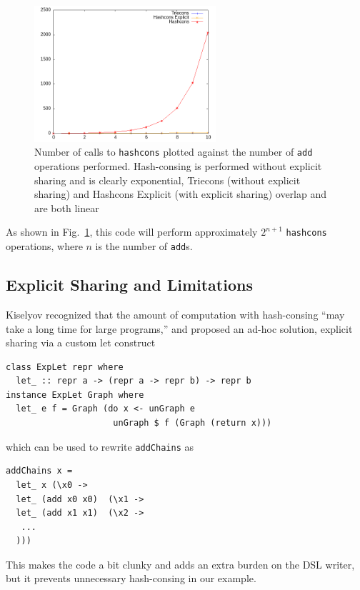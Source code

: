 \documentclass[runningheads]{llncs}
\begin{document}
\vspace{-1cm}
\begin{figure}
  \centering
  \includegraphics[width=0.6\textwidth]{figs/hashconscmp.png}
  \caption{Number of calls to \texttt{hashcons} plotted against the
    number of \texttt{add} operations performed.
    Hash-consing is performed without explicit sharing and is clearly exponential,
    Triecons (without explicit sharing) and Hashcons Explicit (with explicit
    sharing) overlap and are both linear
  } \label{fig:hashcons}
\end{figure}
As shown in Fig.~\ref{fig:hashcons}, this code will perform approximately
$2^{n+1}$ \texttt{hashcons} operations, where $n$ is the number of \texttt{add}s.

\subsection{Explicit Sharing and Limitations} \label{limitexplicit}

Kiselyov \cite{kiselyov:sharing} recognized that the amount of computation with
hash-consing ``may take a long time for large programs,'' and proposed an ad-hoc
solution, explicit sharing via a custom let construct
\begin{verbatim}
class ExpLet repr where
  let_ :: repr a -> (repr a -> repr b) -> repr b
instance ExpLet Graph where
  let_ e f = Graph (do x <- unGraph e
                     unGraph $ f (Graph (return x)))
\end{verbatim}
which can be used to rewrite \texttt{addChains} as
\begin{verbatim}
addChains x =
  let_ x (\x0 ->
  let_ (add x0 x0)  (\x1 ->
  let_ (add x1 x1)  (\x2 ->
   ...
  )))
\end{verbatim}
This makes the code a bit clunky and adds an extra burden on the DSL writer, but
it prevents unnecessary hash-consing in our example.
\end{document}
